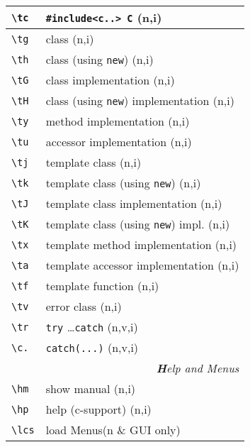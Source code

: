 \documentclass[oneside,11pt,landscape,DIV16]{scrartcl}
\begin{document}
\begin{multicols}{3}
\begin{center}
\begin{tabular}[]{|p{12mm}|p{60mm}|}
\hline \verb'\tc'  & \verb$#include<c..> C$                  \hfill (n,i)\\
\hline \verb'\tg'   & class                                   \hfill (n,i)\\
\hline \verb'\th'  & class (using \verb'new')                \hfill (n,i)\\
\hline \verb'\tG'  & class  implementation                   \hfill (n,i)\\
\hline \verb'\tH' & class (using \verb'new') implementation \hfill (n,i)\\
\hline \verb'\ty'  & method implementation                   \hfill (n,i)\\
\hline \verb'\tu'  & accessor implementation                 \hfill (n,i)\\
\hline \verb'\tj'  & template class                          \hfill (n,i)\\
\hline \verb'\tk' & template class (using \verb'new')       \hfill (n,i)\\
\hline \verb'\tJ' & template class  implementation          \hfill (n,i)\\
\hline \verb'\tK'& template class (using \verb'new') impl. \hfill (n,i)\\
\hline \verb'\tx' & template method implementation          \hfill (n,i)\\
\hline \verb'\ta' & template accessor implementation        \hfill (n,i)\\
\hline \verb'\tf'  & template function                       \hfill (n,i)\\
\hline \verb'\tv'  & error class                             \hfill (n,i)\\
\hline \verb'\tr'  & \verb'try' \dots \verb'catch'           \hfill (n,v,i)\\
\hline \verb'\c.'  & \verb'catch(...)'                       \hfill (n,v,i)\\
\hline 
\hline 
\multicolumn{2}{|r|}{\textsl{\textbf{H}elp and Menus}}\\
\hline \verb'\hm'   & show manual   \hfill (n,i)\\
\hline \verb'\hp'   & help (c-support) \hfill (n,i)\\
\hline \verb'\lcs'  & load    Menus\hfill \scriptsize{(n \& GUI only)}\\

\end{tabular}
\end{center}
\end{multicols}
\end{document}
